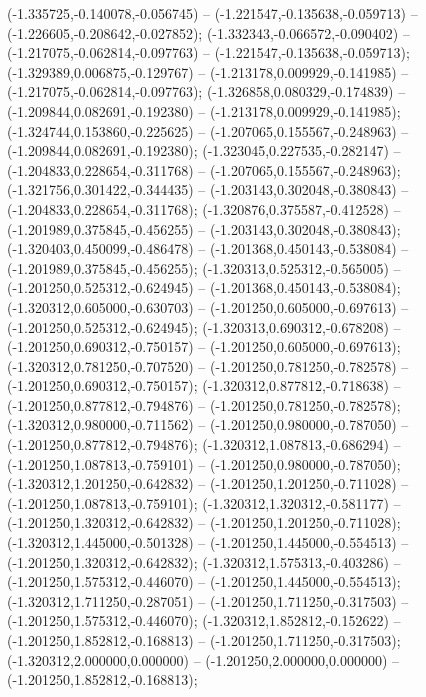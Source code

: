  (-1.335725,-0.140078,-0.056745) -- (-1.221547,-0.135638,-0.059713) -- (-1.226605,-0.208642,-0.027852);
 (-1.332343,-0.066572,-0.090402) -- (-1.217075,-0.062814,-0.097763) -- (-1.221547,-0.135638,-0.059713);
 (-1.329389,0.006875,-0.129767) -- (-1.213178,0.009929,-0.141985) -- (-1.217075,-0.062814,-0.097763);
 (-1.326858,0.080329,-0.174839) -- (-1.209844,0.082691,-0.192380) -- (-1.213178,0.009929,-0.141985);
 (-1.324744,0.153860,-0.225625) -- (-1.207065,0.155567,-0.248963) -- (-1.209844,0.082691,-0.192380);
 (-1.323045,0.227535,-0.282147) -- (-1.204833,0.228654,-0.311768) -- (-1.207065,0.155567,-0.248963);
 (-1.321756,0.301422,-0.344435) -- (-1.203143,0.302048,-0.380843) -- (-1.204833,0.228654,-0.311768);
 (-1.320876,0.375587,-0.412528) -- (-1.201989,0.375845,-0.456255) -- (-1.203143,0.302048,-0.380843);
 (-1.320403,0.450099,-0.486478) -- (-1.201368,0.450143,-0.538084) -- (-1.201989,0.375845,-0.456255);
 (-1.320313,0.525312,-0.565005) -- (-1.201250,0.525312,-0.624945) -- (-1.201368,0.450143,-0.538084);
 (-1.320312,0.605000,-0.630703) -- (-1.201250,0.605000,-0.697613) -- (-1.201250,0.525312,-0.624945);
 (-1.320313,0.690312,-0.678208) -- (-1.201250,0.690312,-0.750157) -- (-1.201250,0.605000,-0.697613);
 (-1.320312,0.781250,-0.707520) -- (-1.201250,0.781250,-0.782578) -- (-1.201250,0.690312,-0.750157);
 (-1.320312,0.877812,-0.718638) -- (-1.201250,0.877812,-0.794876) -- (-1.201250,0.781250,-0.782578);
 (-1.320312,0.980000,-0.711562) -- (-1.201250,0.980000,-0.787050) -- (-1.201250,0.877812,-0.794876);
 (-1.320312,1.087813,-0.686294) -- (-1.201250,1.087813,-0.759101) -- (-1.201250,0.980000,-0.787050);
 (-1.320312,1.201250,-0.642832) -- (-1.201250,1.201250,-0.711028) -- (-1.201250,1.087813,-0.759101);
 (-1.320312,1.320312,-0.581177) -- (-1.201250,1.320312,-0.642832) -- (-1.201250,1.201250,-0.711028);
 (-1.320312,1.445000,-0.501328) -- (-1.201250,1.445000,-0.554513) -- (-1.201250,1.320312,-0.642832);
 (-1.320312,1.575313,-0.403286) -- (-1.201250,1.575312,-0.446070) -- (-1.201250,1.445000,-0.554513);
 (-1.320312,1.711250,-0.287051) -- (-1.201250,1.711250,-0.317503) -- (-1.201250,1.575312,-0.446070);
 (-1.320312,1.852812,-0.152622) -- (-1.201250,1.852812,-0.168813) -- (-1.201250,1.711250,-0.317503);
 (-1.320312,2.000000,0.000000) -- (-1.201250,2.000000,0.000000) -- (-1.201250,1.852812,-0.168813);
